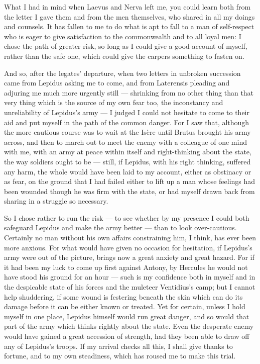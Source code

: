 

 What I had in mind when Laevus and Nerva left me, you could learn both from the letter I gave them and from the men themselves, who shared in all my doings and counsels. It has fallen to me to do what is apt to fall to a man of self-respect who is eager to give satisfaction to the commonwealth and to all loyal men: I chose the path of greater risk, so long as I could give a good account of myself, rather than the safe one, which could give the carpers something to fasten on.

 And so, after the legates' departure, when two letters in unbroken succession came from Lepidus asking me to come, and from Laterensis pleading and adjuring me much more urgently still --- shrinking from no other thing than that very thing which is the source of my own fear too, the inconstancy and unreliability of Lepidus's army --- I judged I could not hesitate to come to their aid and put myself in the path of the common danger. For I saw that, although the more cautious course was to wait at the Is\`ere until Brutus brought his army across, and then to march out to meet the enemy with a colleague of one mind with me, with an army at peace within itself and right-thinking about the state, the way soldiers ought to be --- still, if Lepidus, with his right thinking, suffered any harm, the whole would have been laid to my account, either as obstinacy or as fear, on the ground that I had failed either to lift up a man whose feelings had been wounded though he was firm with the state, or had myself drawn back from sharing in a struggle so necessary.

 So I chose rather to run the risk --- to see whether by my presence I could both safeguard Lepidus and make the army better --- than to look over-cautious. Certainly no man without his own affairs constraining him, I think, has ever been more anxious. For what would have given no occasion for hesitation, if Lepidus's army were out of the picture, brings now a great anxiety and great hazard. For if it had been my luck to come up first against Antony, by Hercules he would not have stood his ground for an hour --- such is my confidence both in myself and in the despicable state of his forces and the muleteer Ventidius's camp; but I cannot help shuddering, if some wound is festering beneath the skin which can do its damage before it can be either known or treated. Yet for certain, unless I hold myself in one place, Lepidus himself would run great danger, and so would that part of the army which thinks rightly about the state. Even the desperate enemy would have gained a great accession of strength, had they been able to draw off any of Lepidus's troops. If my arrival checks all this, I shall give thanks to fortune, and to my own steadiness, which has roused me to make this trial.

